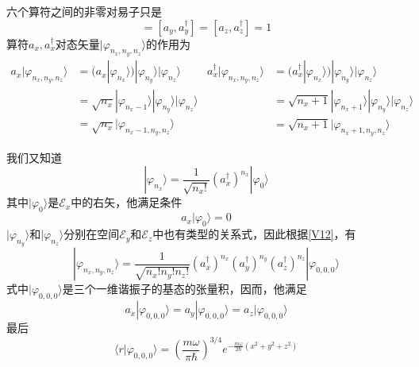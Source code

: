 \documentclass[]{article}
\begin{document}
六个算符之间的非零对易子只是
\begin{equation}
	[a_x,a_x^\dagger]=[a_y,a_y^\dagger]=[a_z,a_z^\dagger]=1
\end{equation}
算符$a_x,a^\dagger_x$对态矢量$|\varphi_{n_x,n_y,n_z}\rangle$的作用为
\begin{subequations}
	\begin{align}
		a_x|\varphi_{n_x,n_y,n_z}\rangle&=(a_x|\varphi_{n_x}\rangle)|\varphi_{n_y}\rangle|\varphi_{n_z}\rangle\nonumber\\
		&=\sqrt{n_x}|\varphi_{n_x-1}\rangle|\varphi_{n_y}\rangle|\varphi_{n_z}\rangle\nonumber\\
		&=\sqrt{n_x}|\varphi_{n_x-1,n_y,n_z}\rangle
	\end{align}
	\begin{align}
		a_x^\dagger|\varphi_{n_x,n_y,n_z}\rangle&=(a_x^\dagger|\varphi_{n_x}\rangle)|\varphi_{n_y}\rangle|\varphi_{n_z}\rangle\nonumber\\
		&=\sqrt{n_x+1}|\varphi_{n_x+1}\rangle|\varphi_{n_y}\rangle|\varphi_{n_z}\rangle\nonumber\\
		&=\sqrt{n_x+1}|\varphi_{n_x+1,n_y,n_z}\rangle
	\end{align}
\end{subequations}

我们又知道
\begin{equation}
	|\varphi_{n_x}\rangle=\dfrac{1}{\sqrt{n_x!}}(a^\dagger_x)^{n_x}|\varphi_0\rangle
\end{equation}
其中$|\varphi_0\rangle$是$\mathscr{E}_x$中的右矢，他满足条件
\begin{equation}
	a_x|\varphi_0\rangle=0
\end{equation}
$|\varphi_{n_y}\rangle$和$|\varphi_{n_z}\rangle$分别在空间$\mathscr{E}_y$和$\mathscr{E}_z$中也有类型的关系式，因此根据\eqref{V12}，有
\begin{equation}
	|\varphi_{n_x,n_y,n_z}\rangle=\dfrac{1}{\sqrt{n_x!n_y!n_z!}}(a^\dagger_x)^{n_x}(a^\dagger_y)^{n_y}(a^\dagger_z)^{n_z}|\varphi_{0,0,0}\rangle
\end{equation}
式中$|\varphi_{0,0,0}\rangle$是三个一维谐振子的基态的张量积，因而，他满足
\begin{equation}
	a_x|\varphi_{0,0,0}\rangle=a_y|\varphi_{0,0,0}\rangle=a_z|\varphi_{0,0,0}\rangle
\end{equation}
最后
\begin{equation}
	\langle r|\varphi_{0,0,0}\rangle=\left( \dfrac{m\omega}{\pi\hbar}\right) ^{3/4}e^{-\frac{m\omega}{2\hbar}(x^2+y^2+z^2)}
\end{equation}
\end{document}
